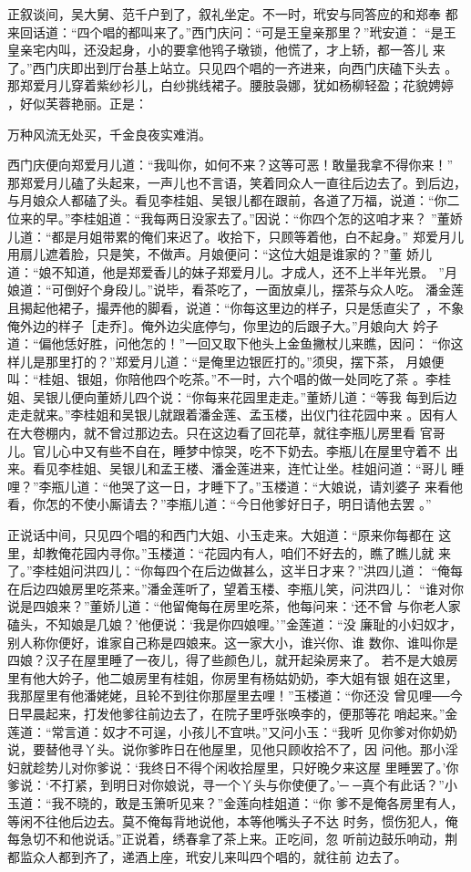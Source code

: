 正叙谈间，吴大舅、范千户到了，叙礼坐定。不一时，玳安与同答应的和郑奉
都来回话道：“四个唱的都叫来了。”西门庆问：“可是王皇亲那里？”玳安道：
“是王皇亲宅内叫，还没起身，小的要拿他鸨子墩锁，他慌了，才上轿，都一答儿
来了。”西门庆即出到厅台基上站立。只见四个唱的一齐进来，向西门庆磕下头去
。那郑爱月儿穿着紫纱衫儿，白纱挑线裙子。腰肢袅娜，犹如杨柳轻盈；花貌娉婷
，好似芙蓉艳丽。正是：

万种风流无处买，千金良夜实难消。

西门庆便向郑爱月儿道：“我叫你，如何不来？这等可恶！敢量我拿不得你来！”
那郑爱月儿磕了头起来，一声儿也不言语，笑着同众人一直往后边去了。到后边，
与月娘众人都磕了头。看见李桂姐、吴银儿都在跟前，各道了万福，说道：“你二
位来的早。”李桂姐道：“我每两日没家去了。”因说：“你四个怎的这咱才来？
”董娇儿道：“都是月姐带累的俺们来迟了。收拾下，只顾等着他，白不起身。”
郑爱月儿用扇儿遮着脸，只是笑，不做声。月娘便问：“这位大姐是谁家的？”董
娇儿道：“娘不知道，他是郑爱香儿的妹子郑爱月儿。才成人，还不上半年光景。
”月娘道：“可倒好个身段儿。”说毕，看茶吃了，一面放桌儿，摆茶与众人吃。
潘金莲且揭起他裙子，撮弄他的脚看，说道：“你每这里边的样子，只是恁直尖了
，不象俺外边的样子［走乔］。俺外边尖底停匀，你里边的后跟子大。”月娘向大
妗子道：“偏他恁好胜，问他怎的！”一回又取下他头上金鱼撇杖儿来瞧，因问：
“你这样儿是那里打的？”郑爱月儿道：“是俺里边银匠打的。”须臾，摆下茶，
月娘便叫：“桂姐、银姐，你陪他四个吃茶。”不一时，六个唱的做一处同吃了茶
。李桂姐、吴银儿便向董娇儿四个说：“你每来花园里走走。”董娇儿道：“等我
每到后边走走就来。”李桂姐和吴银儿就跟着潘金莲、孟玉楼，出仪门往花园中来
。因有人在大卷棚内，就不曾过那边去。只在这边看了回花草，就往李瓶儿房里看
官哥儿。官儿心中又有些不自在，睡梦中惊哭，吃不下奶去。李瓶儿在屋里守着不
出来。看见李桂姐、吴银儿和孟王楼、潘金莲进来，连忙让坐。桂姐问道：“哥儿
睡哩？”李瓶儿道：“他哭了这一日，才睡下了。”玉楼道：“大娘说，请刘婆子
来看他看，你怎的不使小厮请去？”李瓶儿道：“今日他爹好日子，明日请他去罢
。”

正说话中间，只见四个唱的和西门大姐、小玉走来。大姐道：“原来你每都在
这里，却教俺花园内寻你。”玉楼道：“花园内有人，咱们不好去的，瞧了瞧儿就
来了。”李桂姐问洪四儿：“你每四个在后边做甚么，这半日才来？”洪四儿道：
“俺每在后边四娘房里吃茶来。”潘金莲听了，望着玉楼、李瓶儿笑，问洪四儿：
“谁对你说是四娘来？”董娇儿道：“他留俺每在房里吃茶，他每问来：‘还不曾
与你老人家磕头，不知娘是几娘？’他便说：‘我是你四娘哩。’”金莲道：“没
廉耻的小妇奴才，别人称你便好，谁家自己称是四娘来。这一家大小，谁兴你、谁
数你、谁叫你是四娘？汉子在屋里睡了一夜儿，得了些颜色儿，就开起染房来了。
若不是大娘房里有他大妗子，他二娘房里有桂姐，你房里有杨姑奶奶，李大姐有银
姐在这里，我那屋里有他潘姥姥，且轮不到往你那屋里去哩！”玉楼道：“你还没
曾见哩──今日早晨起来，打发他爹往前边去了，在院子里呼张唤李的，便那等花
哨起来。”金莲道：“常言道：奴才不可逞，小孩儿不宜哄。”又问小玉：“我听
见你爹对你奶奶说，要替他寻丫头。说你爹昨日在他屋里，见他只顾收拾不了，因
问他。那小淫妇就趁势儿对你爹说：‘我终日不得个闲收拾屋里，只好晚夕来这屋
里睡罢了。’你爹说：‘不打紧，到明日对你娘说，寻一个丫头与你使便了。’─
─真个有此话？”小玉道：“我不晓的，敢是玉箫听见来？”金莲向桂姐道：“你
爹不是俺各房里有人，等闲不往他后边去。莫不俺每背地说他，本等他嘴头子不达
时务，惯伤犯人，俺每急切不和他说话。”正说着，绣春拿了茶上来。正吃间，忽
听前边鼓乐响动，荆都监众人都到齐了，递酒上座，玳安儿来叫四个唱的，就往前
边去了。

